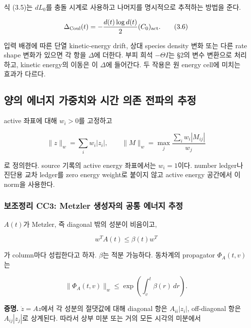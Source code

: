 \documentclass[11pt,a4paper]{article}
\begin{document}
식 (3.5)는 \(dL_0\)를 충돌 시계로 사용하고 나머지를 명시적으로 추적하는 방법을 준다.

\[
\Delta_{\rm Coul}(t)
=-\frac{d(t)\log d(t)}2(C_0)_{\rm act}.
\tag{3.6}
\]

입력 배경에 따른 단열 kinetic-energy drift, 상대 species density 변화 또는 다른 rate shape 변화가 있으면 각 항을 \(\Delta\)에 더한다. 부피 희석 \(-\Theta I\)는 §2의 변수 변환으로 처리하고, kinetic energy의 이동은 이 \(\Delta\)에 들어간다. 두 작용은 원 energy cell에 미치는 효과가 다르다.

\hypertarget{uxc591uxc758-uxc5d0uxb108uxc9c0-uxac00uxc911uxce58uxc640-uxc2dcuxac04-uxc758uxc874-uxc804uxd30cuxc758-uxcd94uxc815}{%
\subsection{양의 에너지 가중치와 시간 의존 전파의 추정}\label{uxc591uxc758-uxc5d0uxb108uxc9c0-uxac00uxc911uxce58uxc640-uxc2dcuxac04-uxc758uxc874-uxc804uxd30cuxc758-uxcd94uxc815}}

active 좌표에 대해 \(w_i>0\)를 고정하고

\[
\|z\|_w=\sum_iw_i|z_i|,\qquad
\|M\|_w=\max_j\frac{\sum_iw_i|M_{ij}|}{w_j}
\tag{4.1}
\]

로 정의한다. source 기록의 active energy 좌표에서는 \(w_i=1\)이다. number ledger나 진단용 교차 ledger를 zero energy weight로 붙이지 않고 active energy 공간에서 이 norm을 사용한다.

\hypertarget{uxbcf4uxc870uxc815uxb9ac-cc3-metzler-uxc0dduxc131uxc790uxc758-uxacf5uxd1b5-uxc5d0uxb108uxc9c0-uxcd94uxc815}{%
\subsubsection{보조정리 CC3: Metzler 생성자의 공통 에너지 추정}\label{uxbcf4uxc870uxc815uxb9ac-cc3-metzler-uxc0dduxc131uxc790uxc758-uxacf5uxd1b5-uxc5d0uxb108uxc9c0-uxcd94uxc815}}

\(A(t)\)가 Metzler, 즉 diagonal 밖의 성분이 비음이고,

\[
w^TA(t)\le\beta(t)w^T
\tag{4.2}
\]

가 column마다 성립한다고 하자. \(\beta\)는 적분 가능하다. 동차계의 propagator \(\Phi_A(t,v)\)는

\[
\boxed{
\|\Phi_A(t,v)\|_w
\le\exp\!\left(\int_v^t\beta(r)\,dr\right).
}
\tag{4.3}
\]

\textbf{증명.} \(\dot z=A z\)에서 각 성분의 절댓값에 대해 diagonal 항은 \(A_{ii}|z_i|\), off-diagonal 항은 \(A_{ij}|z_j|\)로 상계된다. 따라서 상부 미분 또는 거의 모든 시각의 미분에서
\end{document}
